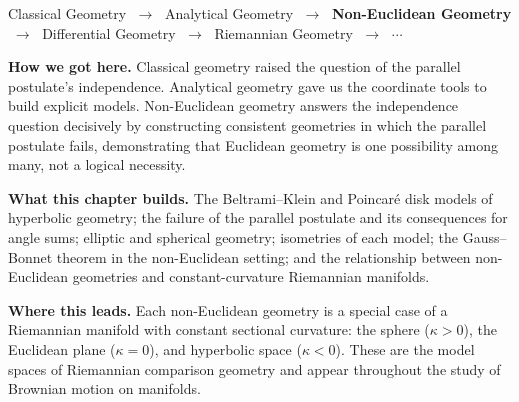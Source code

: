 
\begin{tcolorbox}[
  colback=gray!6,
  colframe=gray!40,
  arc=2pt,
  left=8pt, right=8pt, top=6pt, bottom=6pt,
  title={\small\textbf{Where You Are in the Journey}},
  fonttitle=\small\bfseries
]
\begin{center}
\small
Classical Geometry
$\;\to\;$ Analytical Geometry
$\;\to\;$ \textbf{Non-Euclidean Geometry}
$\;\to\;$ Differential Geometry
$\;\to\;$ Riemannian Geometry
$\;\to\;$ $\cdots$
\end{center}

\medskip
\noindent\textbf{How we got here.}
Classical geometry raised the question of the parallel postulate's
independence.
Analytical geometry gave us the coordinate tools to build
explicit models.
Non-Euclidean geometry answers the independence question
decisively by constructing consistent geometries in which the
parallel postulate fails, demonstrating that Euclidean geometry
is one possibility among many, not a logical necessity.

\medskip
\noindent\textbf{What this chapter builds.}
The Beltrami--Klein and Poincar\'e disk models of hyperbolic
geometry; the failure of the parallel postulate and its
consequences for angle sums; elliptic and spherical geometry;
isometries of each model; the Gauss--Bonnet theorem in the
non-Euclidean setting; and the relationship between
non-Euclidean geometries and constant-curvature Riemannian
manifolds.

\medskip
\noindent\textbf{Where this leads.}
Each non-Euclidean geometry is a special case of a Riemannian
manifold with constant sectional curvature: the sphere
($\kappa > 0$), the Euclidean plane ($\kappa = 0$), and
hyperbolic space ($\kappa < 0$).
These are the model spaces of Riemannian comparison geometry
and appear throughout the study of Brownian motion on manifolds.
\end{tcolorbox}
\vspace{1em}

